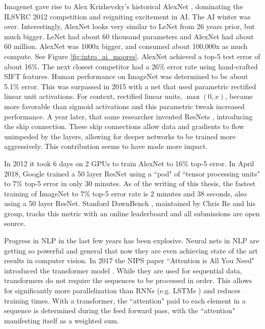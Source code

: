Imagenet gave rise to Alex Krizhevsky's historical AlexNet \cite{krizhevsky2012imagenet}, dominating the ILSVRC 2012 competition and reigniting excitement in AI.  The AI winter was over.  Interestingly, AlexNet looks very similar to LeNet from 26 years prior, but much bigger.  LeNet had about 60 thousand parameters and AlexNet had about 60 million.  AlexNet was 1000x bigger, and consumed about 100,000x as much compute.  See Figure \ref{fig:intro_ai_moores}.  AlexNet achieved a top-5 test error of about 16\%.  The next closest competitor had a 26\% error rate using hand-crafted SIFT features.  Human performance on ImageNet was determined to be about 5.1\% error.  This was surpassed in 2015 \cite{he2015delving} with a net that used parametric rectified linear unit activations.  For context, rectified linear units, $\max(0, x)$, became more favorable than sigmoid activations and this parametric tweak increased performance.  A year later, that same researcher invented ResNets \cite{he2016deep}, introducing the skip connection.  These skip connections allow data and gradients to flow unimpeded by the layers, allowing for deeper networks to be trained more aggressively.  This contribution seems to have made more impact.

In 2012 it took 6 days on 2 GPUs to train AlexNet to 16\% top-5 error.  In April 2018, Google trained a 50 layer ResNet using a ``pod" of ``tensor processing units" to 7\% top-5 error in only 30 minutes.  As of the writing of this thesis, the fastest training of ImageNet to 7\% top-5 error rate is 2 minutes and 38 seconds, also using a 50 layer ResNet.  Stanford DawnBench \cite{coleman2017dawnbench}, maintained by Chris Re and his group, tracks this metric with an online leaderboard and all submissions are open source.

Progress in NLP in the last few years has been explosive.  Neural nets in NLP are getting so powerful and general that now they are even achieving state of the art results in computer vision. In 2017 the NIPS paper ``Attention is All You Need" introduced the transformer model \cite{vaswani2017attention}.  While they are used for sequential data, transformers do not require the sequences to be processed in order. This allows for significantly more parallelization than RNNs (e.g. LSTMs \cite{hochreiter1997long}) and reduces training times.  With a transformer, the ``attention" paid to each element in a sequence is determined during the feed forward pass, with the ``attention" manifesting itself as a weighted sum.

